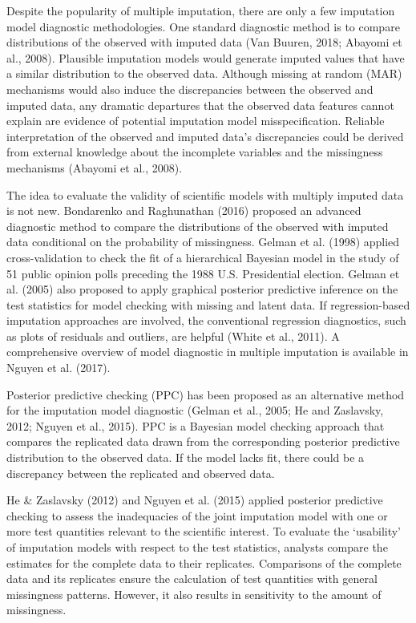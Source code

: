 \documentclass[12pt, fullpage, a4paper]{article}
\begin{document}
Despite the popularity of multiple imputation, there are only a few imputation model diagnostic methodologies. One standard diagnostic method is to compare distributions of the observed with imputed data (Van Buuren, 2018;\nocite{Buuren2018} Abayomi et al., 2008\nocite{abayomi2008diagnostics}). Plausible imputation models would generate imputed values that have a similar distribution to the observed data. Although missing at random (MAR) mechanisms would also induce the discrepancies between the observed and imputed data, any dramatic departures that the observed data features cannot explain are evidence of potential imputation model misspecification. Reliable interpretation of the observed and imputed data's discrepancies could be derived from external knowledge about the incomplete variables and the missingness mechanisms (Abayomi et al., 2008). 


The idea to evaluate the validity of scientific models with multiply imputed data is not new. Bondarenko and Raghunathan (2016)\nocite{bondarenko2016graphical} proposed an advanced diagnostic method to compare the distributions of the observed with imputed data conditional on the probability of missingness. Gelman et al. (1998)\nocite{gelman1998not} applied cross-validation to check the fit of a hierarchical Bayesian model in the study of 51 public opinion polls preceding the 1988 U.S. Presidential election. Gelman et al. (2005)\nocite{gelman2005multiple} also proposed to apply graphical posterior predictive inference on the test statistics for model checking with missing and latent data. If regression-based imputation approaches are involved, the conventional regression diagnostics, such as plots of residuals and outliers, are helpful (White et al., 2011)\nocite{white2011multiple}. A comprehensive overview of model diagnostic in multiple imputation is available in Nguyen et al. (2017)\nocite{nguyen2017model}.

Posterior predictive checking (PPC) has been proposed as an alternative method for the imputation model diagnostic (Gelman et al., 2005; He and Zaslavsky, 2012; Nguyen et al., 2015\nocite{nguyen2015posterior}). PPC is a Bayesian model checking approach that compares the replicated data drawn from the corresponding posterior predictive distribution to the observed data. If the model lacks fit, there could be a discrepancy between the replicated and observed data.


He \& Zaslavsky (2012) and Nguyen et al. (2015) applied posterior predictive checking to assess the inadequacies of the joint imputation model with one or more test quantities relevant to the scientific interest. To evaluate the `usability' of imputation models with respect to the test statistics, analysts compare the estimates for the complete data to their replicates. Comparisons of the complete data and its replicates ensure the calculation of test quantities with general missingness patterns. However, it also results in sensitivity to the amount of missingness. 
\end{document}
